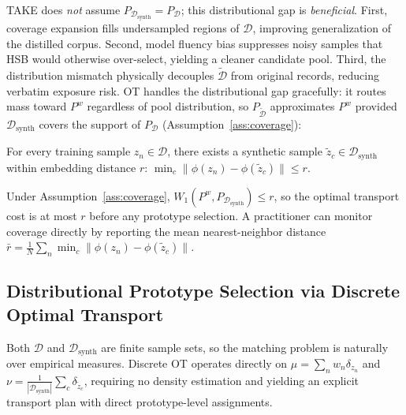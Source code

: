 \begin{foldable} %
  TAKE does \emph{not} assume $P_{\mathcal{D}_\text{synth}} = P_{\mathcal{D}}$; this distributional gap is \emph{beneficial}.
  First, coverage expansion fills undersampled regions of $\mathcal{D}$, improving generalization of the distilled corpus.
  Second, model fluency bias suppresses noisy samples that HSB would otherwise over-select, yielding a cleaner candidate pool.
  Third, the distribution mismatch physically decouples $\tilde{\mathcal{D}}$ from original records, reducing verbatim exposure risk.
  OT handles the distributional gap gracefully: it routes mass toward $P^w$ regardless of pool distribution, so $P_{\tilde{\mathcal{D}}}$ approximates $P^w$ provided $\mathcal{D}_\text{synth}$ covers the support of $P_{\mathcal{D}}$ (Assumption~\ref{ass:coverage}):
  \begin{assumption} \label{ass:coverage}
    For every training sample $z_n \in \mathcal{D}$, there exists a synthetic sample $\tilde{z}_c \in \mathcal{D}_\text{synth}$ within embedding distance $r$:
    $\min_c \|\phi(z_n) - \phi(\tilde{z}_c)\| \leq r$.
  \end{assumption}
  Under Assumption~\ref{ass:coverage}, $W_1(P^w, P_{\mathcal{D}_\text{synth}}) \leq r$, so the optimal transport cost is at most $r$ before any prototype selection.
  A practitioner can monitor coverage directly by reporting the mean nearest-neighbor distance $\bar{r} = \frac{1}{N}\sum_n \min_c \|\phi(z_n) - \phi(\tilde{z}_c)\|$.
\end{foldable}

\subsection{Distributional Prototype Selection via Discrete Optimal Transport} \label{sec:04-method-ot}

\begin{foldable} %
  Both $\mathcal{D}$ and $\mathcal{D}_\text{synth}$ are finite sample sets, so the matching problem is naturally over empirical measures.
  Discrete OT operates directly on $\mu = \sum_n w_n \delta_{z_n}$ and $\nu = \frac{1}{|\mathcal{D}_\text{synth}|}\sum_c \delta_{\tilde{z}_c}$, requiring no density estimation and yielding an explicit transport plan with direct prototype-level assignments.
\end{foldable}

